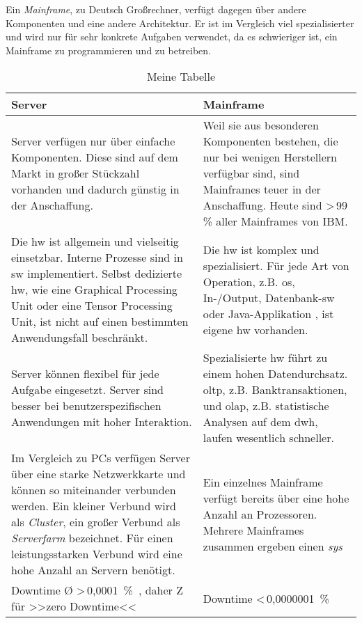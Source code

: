 Ein \emph{Mainframe}, zu Deutsch Großrechner, verfügt dagegen über andere Komponenten und eine andere Architektur. Er ist im Vergleich viel spezialisierter und wird nur für sehr konkrete Aufgaben verwendet, da es schwieriger ist, ein Mainframe zu programmieren und zu betreiben.
\begin{table}[H]
    \centering
    \begin{tabularx}{\textwidth}{|X|X|}
        \hline
        \textbf{Server} & \textbf{Mainframe} \\
        \hline
        Server verfügen nur über einfache Komponenten. Diese sind auf dem Markt in großer Stückzahl vorhanden und dadurch günstig in der Anschaffung.
        &
        Weil sie aus besonderen Komponenten bestehen, die nur bei wenigen Herstellern verfügbar sind, sind Mainframes teuer in der Anschaffung. Heute sind >\,99 \% aller Mainframes von IBM.
        \\
        \hline
        Die \ac{hw} ist allgemein und vielseitig einsetzbar. Interne Prozesse sind in \ac{sw} implementiert. Selbst dedizierte \ac{hw}, wie eine Graphical Processing Unit oder eine Tensor Processing Unit, ist nicht auf einen bestimmten Anwendungsfall beschränkt.
        &
        Die \ac{hw} ist komplex und spezialisiert. Für jede Art von Operation, z.B. \ac{os}, In-/Output, Datenbank-\ac{sw} oder Java-Applikation \cite{redbook.1}, ist eigene \ac{hw} vorhanden.
        \\
        \hline
        Server können flexibel für jede Aufgabe eingesetzt. Server sind besser bei benutzerspezifischen Anwendungen mit hoher Interaktion.
        &
        Spezialisierte \ac{hw} führt zu einem hohen Datendurchsatz. \ac{oltp}, z.B. Banktransaktionen, und \ac{olap}, z.B. statistische Analysen auf dem \ac{dwh}, laufen wesentlich schneller.
        \\
        \hline
        Im Vergleich zu PCs verfügen Server über eine starke Netzwerkkarte und können so miteinander verbunden werden. Ein kleiner Verbund wird als \emph{Cluster}, ein großer Verbund als \emph{Serverfarm} bezeichnet. Für einen leistungsstarken Verbund wird eine hohe Anzahl an Servern benötigt.
        &
        Ein einzelnes Mainframe verfügt bereits über eine hohe Anzahl an Prozessoren. Mehrere Mainframes zusammen ergeben einen \emph{\acs{sys}}
        \\
        \hline
        Downtime Ø >\,0,0001~\%~\cite{itic}, daher \frq{}Z\flq{} für >>zero Downtime<<
        &
        Downtime <\,0,0000001~\%
        \\
        \hline
    \end{tabularx}
    \caption{Meine Tabelle}
\end{table}


